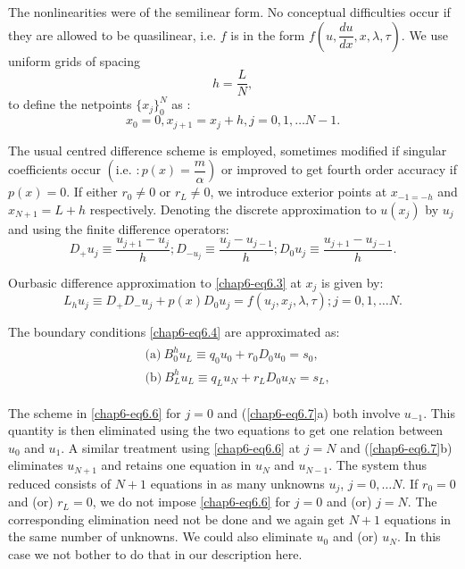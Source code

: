 The nonlinearities were of the semilinear form. No conceptual
difficulties occur if they are allowed to be quasilinear, i.e. $f$ is
in the form $f\left(u,\dfrac{du}{dx},x,\lambda,\tau \right)$. We use
uniform grids of spacing 
\begin{equation*}
h = \frac{L}{N}, \tag{6.5a}\label{chap6-eq6.5a}
\end{equation*}
to define the netpoints $\{ x_j\}^N_0$ as :
\begin{equation*}
x_0  = 0,x_{j+1} = x_j + h, j= 0,1,\ldots N-1.\tag{6.5b}\label{chap6-eq6.5b}
\end{equation*}

The usual centred difference scheme is employed, sometimes modified if
singular coefficients occur $\left(\text{i.e. } : p(x) =
  \dfrac{m}{\alpha} \right)$ or improved to get fourth order accuracy
  if $p(x) = 0$. If either $r_0 \neq 0 $ or $r_L \neq 0$, we introduce
  exterior points at $x_{-1 = -h}$ and $x_{N+1} = L+h$
  respectively. Denoting the discrete approximation to $u(x_j)$ by
  $u_j$ and using the finite difference operators:  
$$
D_+ u_j \equiv \frac{u_{j+1}-u_j}{h} ; D_{-u_j}\equiv \frac{u_j
  -u_{j-1}}{h} ; D_0 u_j \equiv \frac{u_{j+1}-u_{j-1}}{h}. 
$$

Our\pageoriginale basic difference approximation to
\eqref{chap6-eq6.3} at $x_j$ is given by:  
\begin{equation*}
L_hu_j \equiv D_+ D_-u_j +p(x) D_0u_j = f(u_j,x_j,\lambda,\tau); j =
0,1,\ldots N.\tag{6.6}\label{chap6-eq6.6} 
\end{equation*}

The boundary conditions \eqref{chap6-eq6.4} are approximated as:
\begin{align*}
\begin{split}
&\text{(a)}~ B^h_0 u_L \equiv q_0 u_0 + r_0 D_0 u_0 = s_0,\\ 
&\text{(b)}~ B^h_L u_L \equiv q_L u_N + r_L D_0 u_N = s_L,
\end{split}\tag{6.7}\label{chap6-eq6.7}
\end{align*}

The scheme in \eqref{chap6-eq6.6} for $j = 0$ and (\ref{chap6-eq6.7}a)
both involve 
$u_{-1}$. This quantity is then eliminated using the two equations to
get one relation between $u_0$ and $u_1$. A similar treatment using
\eqref{chap6-eq6.6} at $j=N$ and (\ref{chap6-eq6.7}b) eliminates
$u_{N+1}$ and retains one 
equation in $u_N$ and $u_{N-1}$. The system thus reduced consists of
$N+1$ equations in as many unknowns $u_j$, $j = 0,\ldots N$. If  $r_0 =
0$ and (or) $r_L = 0$, we do not impose \eqref{chap6-eq6.6} for $j=0$
and (or) $j = N$. The corresponding elimination need not be done and
we again get 
$N+1$ equations in the same number of unknowns. We could also
eliminate $u_0$ and (or) $u_N$. In this case we not bother to do that
in our description here. 

